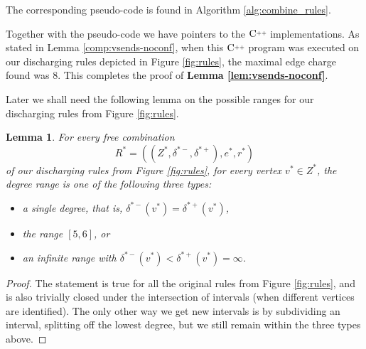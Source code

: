 \documentclass[10pt,a4paper]{article}
\newtheorem{lem}[thm]{Lemma}
\def\Cpp{\textnormal C\raisebox{0.5ex}{\tiny++}}
\begin{document}
The corresponding pseudo-code is found in Algorithm \ref{alg:combine_rules}.

Together with the pseudo-code we have pointers to the $\Cpp$ implementations. As stated in Lemma \ref{comp:vsends-noconf}, when this $\Cpp$ program was executed on our discharging rules depicted in Figure \ref{fig:rules}, the maximal edge charge found was 8. This completes the proof of 
{\bf Lemma \ref{lem:vsends-noconf}}.

\medskip

Later we shall need the following lemma on the possible ranges for our discharging rules from Figure \ref{fig:rules}.

\begin{lem}\label{lem:ranges}
For every free combination
\[R^*=((Z^*,\delta^{*-},\delta^{*+}),e^*,r^*)\]
of our discharging rules from Figure \ref{fig:rules}, for every vertex 
$v^*\in Z^*$, the degree range is one of the following three types:
\begin{itemize}
    \item a single degree, that is, 
    $\delta^{*-}(v^*)=\delta^{*+}(v^*)$,
    \item the range $[5,6]$, or
    \item an infinite range with $\delta^{*-}(v^*)<\delta^{*+}(v^*)=\infty$.
\end{itemize}
\end{lem}
\begin{proof}
The statement is true for all the original rules from Figure \ref{fig:rules}, and is also trivially closed under the intersection of intervals (when different vertices are identified). The only other way we get new intervals is by subdividing an interval, splitting off the lowest degree, but we still remain within the three types above.
\end{proof}
\end{document}
